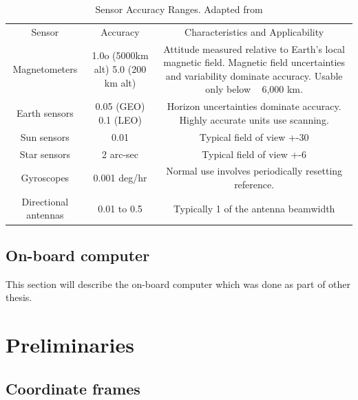 \documentclass[12pt,a4paper,oneside]{article}
\begin{document}
\cite{larson1992space}
\begin{table}[ht]

\begin{tabular}{ccc}
Sensor & Accuracy & Characteristics and Applicability \\ 
Magnetometers & 1.0o (5000km alt) 5.0 (200 km alt) & Attitude measured relative to Earth’s local magnetic field. Magnetic field uncertainties and variability dominate accuracy. Usable only below ~ 6,000 km. \\ 
Earth sensors & 0.05 (GEO) 0.1 (LEO) & Horizon uncertainties dominate accuracy. Highly accurate units use scanning. \\ 
Sun sensors & 0.01 & Typical field of view +-30 \\ 
Star sensors & 2 arc-sec & Typical field of view +-6 \\ 
Gyroscopes & 0.001 deg/hr & Normal use involves periodically resetting reference. \\ 
Directional antennas & 0.01 to 0.5 & Typically 1 of the antenna beamwidth

\end{tabular} 
\caption{Sensor Accuracy Ranges. Adapted from \cite{hall2003spacecraft}}

\end{table}
\cite{lima2000comparison}

\subsection{On-board computer}
This section will describe the on-board computer which was done as part of other thesis.

\newpage
\section{Preliminaries}
\subsection{Coordinate frames}
\end{document}
